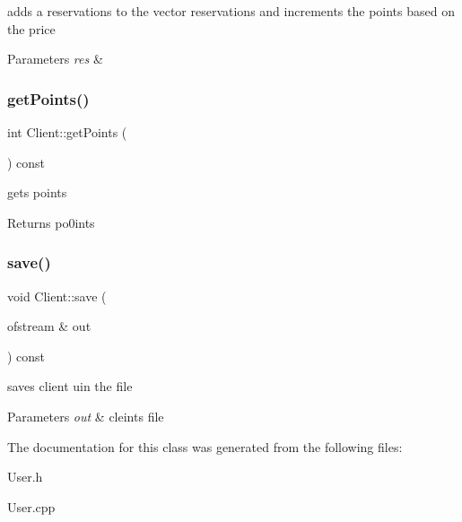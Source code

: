 adds a reservations to the vector reservations and increments the points based on the price 


\begin{DoxyParams}{Parameters}
{\em res} & \\
\hline
\end{DoxyParams}
\hypertarget{class_client_aa3824f589da51dc537ccab1bcfcc8e85}{}\label{class_client_aa3824f589da51dc537ccab1bcfcc8e85} 
\subsubsection{\texorpdfstring{get\+Points()}{getPoints()}}
{\footnotesize\ttfamily int Client\+::get\+Points (\begin{DoxyParamCaption}{ }\end{DoxyParamCaption}) const\hspace{0.3cm}{\ttfamily [inline]}}



gets points 

\begin{DoxyReturn}{Returns}
po0ints 
\end{DoxyReturn}
\hypertarget{class_client_a2a03ca4558efd182ea5d76dfcec24ecb}{}\label{class_client_a2a03ca4558efd182ea5d76dfcec24ecb} 
\subsubsection{\texorpdfstring{save()}{save()}}
{\footnotesize\ttfamily void Client\+::save (\begin{DoxyParamCaption}\item[{ofstream \&}]{out }\end{DoxyParamCaption}) const}



saves client uin the file 


\begin{DoxyParams}{Parameters}
{\em out} & cleints file \\
\hline
\end{DoxyParams}


The documentation for this class was generated from the following files\+:\begin{DoxyCompactItemize}
\item 
User.\+h\item 
User.\+cpp\end{DoxyCompactItemize}

